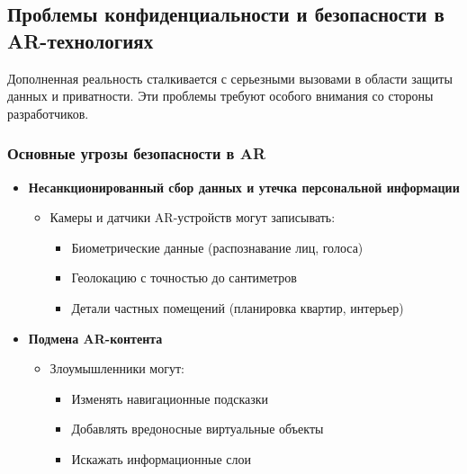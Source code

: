 \subsection{Проблемы конфиденциальности и безопасности в AR-технологиях}
Дополненная реальность сталкивается с серьезными вызовами в области защиты данных и приватности. Эти проблемы требуют особого внимания со стороны разработчиков.

\subsubsection{Основные угрозы безопасности в AR}
\begin{itemize}
    \item \textbf{Несанкционированный сбор данных и утечка персональной информации}
    \begin{itemize}
        \item Камеры и датчики AR-устройств могут записывать:
        \begin{itemize}
            \item Биометрические данные (распознавание лиц, голоса)
            \item Геолокацию с точностью до сантиметров
            \item Детали частных помещений (планировка квартир, интерьер)
        \end{itemize}
    \end{itemize}
    
    \item \textbf{Подмена AR-контента}
    \begin{itemize}
        \item Злоумышленники могут:
        \begin{itemize}
            \item Изменять навигационные подсказки
            \item Добавлять вредоносные виртуальные объекты
            \item Искажать информационные слои
        \end{itemize}
    \end{itemize}
\end{itemize}


